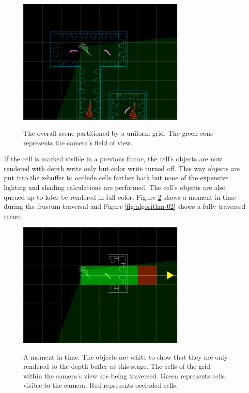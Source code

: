 \documentclass[12pt]{ucthesis}
\newcommand{\captionfonts}{\small\bf\ssp}
\begin{document}
\begin{figure}
\begin{center}
\includegraphics[width=0.75\textwidth]{Images/sceneAlgorithm/00.png}
\captionfonts
\caption[A Scene]{The overall scene partitioned by a uniform grid.  The green cone represents the camera's field of view.}
\label{fig:algorithm-00}
\end{center}
\end{figure}

If the cell is marked visible in a previous frame, the cell's objects are now rendered with depth write only but color write turned off.
This way objects are put into the z-buffer to occlude cells farther back but none of the expensive lighting and shading calculations are performed.
The cell's objects are also queued up to later be rendered in full color.
Figure \ref{fig:algorithm-01} shows a moment in time during the frustum traversal and Figure \ref{fig:algorithm-02} shows a fully traversed scene.

\begin{figure}
\begin{center}
\includegraphics[width=0.75\textwidth]{Images/sceneAlgorithm/01.png}
\captionfonts
\caption[Traversing The Camera View]{A moment in time.  The objects are white to show that they are only rendered to the depth buffer at this stage.  The cells of the grid within the camera's view are being traversed.  Green represents cells visible to the camera.  Red represents occluded cells.}
\label{fig:algorithm-01}
\end{center}
\end{figure}
\end{document}
